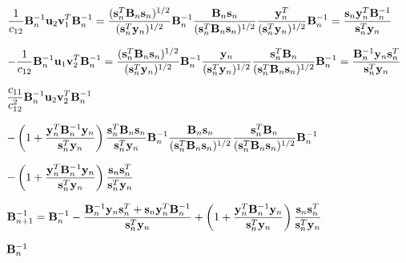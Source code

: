 \documentclass{article}
\def\lthtmlcheckvsize{\ifdim\ht\sizebox<\vsize 
  \ifdim\wd\sizebox<\hsize\expandafter\hfill\fi \expandafter\vfill
  \else\expandafter\vss\fi}%
\begin{document}
{\newpage\clearpage
{}%
$\displaystyle \frac{1}{c_{12}}{\bf B}_n^{-1}{\bf u}_2{\bf v}_1^T{\bf B}_n^{-1}
=\frac{({\bf s}_n^T{\bf B}_n{\bf s}_n)^{1/2} }{({\bf s}_n^T{\bf y}_n)^{1/2}}
{\bf B}_n^{-1}
\frac{{\bf B}_n{\bf s}_n}{({\bf s}_n^T{\bf B}_n{\bf s}_n)^{1/2}}
\frac{{\bf y}^T_n}{({\bf s}_n^T{\bf y}_n)^{1/2}} {\bf B}_n^{-1}
=\frac{{\bf s}_n{\bf y}_n^T{\bf B}_n^{-1}}{{\bf s}_n^T{\bf y}_n}$%
\lthtmlindisplaymathZ
\lthtmlcheckvsize\clearpage}

{\newpage\clearpage
{}%
$\displaystyle -\frac{1}{c_{12}}{\bf B}_n^{-1}{\bf u}_1{\bf v}_2^T{\bf B}_n^{-1}
=\frac{({\bf s}_n^T{\bf B}_n{\bf s}_n)^{1/2} }{({\bf s}_n^T{\bf y}_n)^{1/2}}
{\bf B}_n^{-1}
\frac{{\bf y}_n}{({\bf s}_n^T{\bf y}_n)^{1/2}}
\frac{{\bf s}_n^T {\bf B}_n}{({\bf s}_n^T{\bf B}_n{\bf s}_n)^{1/2}}{\bf B}_n^{-1}
=\frac{{\bf B}_n^{-1}{\bf y}_n{\bf s}_n^T}{{\bf s}_n^T{\bf y}_n}$%
\lthtmlindisplaymathZ
\lthtmlcheckvsize\clearpage}

{\newpage\clearpage
{}%
$\displaystyle \frac{c_{11}}{c_{12}^2}{\bf B}_n^{-1}{\bf u}_2{\bf v}_2^T{\bf B}_n^{-1}$%
\lthtmlindisplaymathZ
\lthtmlcheckvsize\clearpage}

{\newpage\clearpage
{}%
$\displaystyle -\left(1+\frac{{\bf y}^T_n{\bf B}_n^{-1}{\bf y}_n}{{\bf s}_n^T{\bf y}_n}\right)
\frac{{\bf s}_n^T{\bf B}_n{\bf s}_n}{{\bf s}_n^T{\bf y}_n} {\bf B}_n^{-1}
\frac{{\bf B}_n{\bf s}_n}{({\bf s}_n^T{\bf B}_n{\bf s}_n)^{1/2}}
\frac{{\bf s}_n^T {\bf B}_n}{({\bf s}_n^T{\bf B}_n{\bf s}_n)^{1/2}} {\bf B}_n^{-1}$%
\lthtmlindisplaymathZ
\lthtmlcheckvsize\clearpage}

{\newpage\clearpage
{}%
$\displaystyle -\left(1+\frac{{\bf y}^T_n{\bf B}_n^{-1}{\bf y}_n}{{\bf s}_n^T{\bf y}_n}\right)
\frac{{\bf s}_n{\bf s}_n^T}{{\bf s}_n^T{\bf y}_n}$%
\lthtmlindisplaymathZ
\lthtmlcheckvsize\clearpage}

{\newpage\clearpage
{}%
$\displaystyle {\bf B}_{n+1}^{-1}=
{\bf B}_n^{-1}-\frac{{\bf B}_n^{-1}{\bf y}_n{\bf s}_n^T+{\bf s}_n{\bf y}_n^T{\bf B}_n^{-1}}{{\bf s}_n^T{\bf y}_n}
+\left(1+\frac{{\bf y}^T_n{\bf B}_n^{-1}{\bf y}_n}{{\bf s}_n^T{\bf y}_n}\right)
\frac{{\bf s}_n{\bf s}_n^T}{{\bf s}_n^T{\bf y}_n}$%
\lthtmlindisplaymathZ
\lthtmlcheckvsize\clearpage}

{\newpage\clearpage
{}%
$ {\bf B}^{-1}_n$%
\lthtmlindisplaymathZ
\lthtmlcheckvsize\clearpage}
\end{document}
